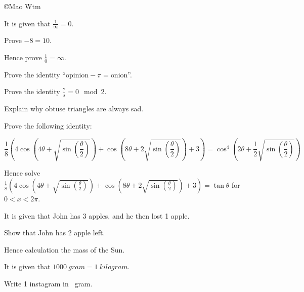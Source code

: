 \documentclass{cie}
\begin{document}
  \copyright{Mao Wtm \ccbysa}
  \subject{MATHEMATICS (FUNNIER)}
  \coverpage

  \begin{question}
    It is given that $\frac{1}{\infty} = 0$.

    \subquestion Prove $-8 = 10$. 
    \writinglinesfor{5cm}

    \subquestion Hence prove $\frac{1}{0} = \infty$. 
    \writinglinestillvfill
    \printtotalmark
    \newpage
  \end{question}

  \begin{question}
    \subquestion Prove the identity ``$\text{opinion} - \pi = \text{onion}$''.  
    \writinglinesfor{3cm}

    \subquestion Prove the identity $\frac{7}{s} = 0 \mod 2$. 
    \writinglinesfor{6cm}

    \subquestion Explain why obtuse triangles are always sad. 
    \writinglinestillvfill
    \printtotalmark
    \newpage
  \end{question}

  \begin{question}
    \subquestion Prove the following identity: 

    $$\frac{1}{8} (4 \cos(4 \theta + \sqrt{ \sin (\frac{\theta}{2}) }) + \cos (8 \theta + 2 \sqrt{ \sin (\frac{\theta}{2}) }) + 3) =
      \cos^4 (2 \theta + \frac{1}{2} \sqrt{ \sin (\frac{\theta}{2}) })$$

    \writinglinestillvfill
    \newpage

    \subquestion Hence solve $\frac{1}{8} (4 \cos(4 \theta + \sqrt{ \sin (\frac{\theta}{2}) }) + \cos (8 \theta + 2 \sqrt{ \sin (\frac{\theta}{2}) }) + 3) = \tan \theta$
      for $0 < x < 2\pi$. 
    \writinglinesfor{8cm}

    \printtotalmark
  \end{question}

  \begin{question}
    It is given that John has 3 apples, and he then lost 1 apple.

    \subquestion Show that John has 2 apple left. 
    \writinglinesfor{2cm}

    \subquestion Hence calculation the mass of the Sun. 
    \writinglinestillvfill
    \newpage

    It is given that $\SI{1000}{gram} = \SI{1}{kilogram}$.

    \subquestion Write 1 instagram in \SI{}{gram}. 
    \writinglinesfor{3cm}

    \printtotalmark
  \end{question}

  \finalstuff
\end{document}
